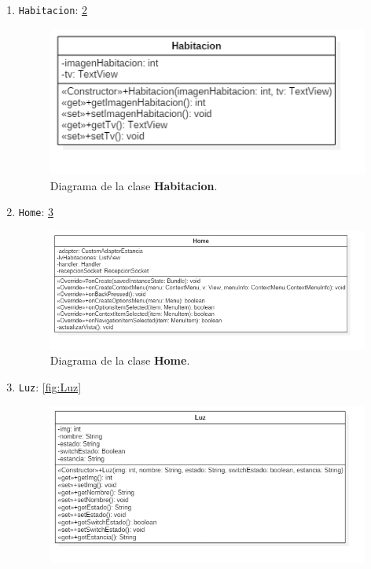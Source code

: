 \begin{enumerate}
\begin{figure}[h!]
		\label{fig:CustomAdapterLuz}
	\end{figure}
	\item \verb|Habitacion|: \ref{fig:Habitacion}
	\begin{figure}[h!]
		\centering
		\includegraphics[width=1\linewidth]{img/Habitacion}
		\caption{Diagrama de la clase \textbf{Habitacion}.}
		\label{fig:Habitacion}
	\end{figure}
	\item \verb|Home|: \ref{fig:Home}
	\begin{figure}[h!]
		\centering
		\includegraphics[width=1.2\linewidth]{img/Home}
		\caption{Diagrama de la clase \textbf{Home}.}
		\label{fig:Home}
	\end{figure}
	\item \verb|Luz|: \ref{fig:Luz}
	\begin{figure}[h!]
		\centering
		\includegraphics[width=1.2\linewidth]{img/Luz}

\end{figure}
\end{enumerate}
